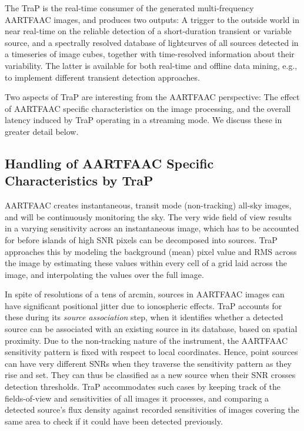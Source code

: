 \documentclass{ws-jai}
\begin{document}
The TraP  is the  real-time consumer of  the generated  multi-frequency AARTFAAC
images,  and produces  two  outputs: A  trigger  to the  outside  world in  near
real-time on  the reliable detection  of a short-duration transient  or variable
source,  and  a spectrally  resolved  database  of  lightcurves of  all  sources
detected in a timeseries of image cubes, together with time-resolved information
about their variability.  The latter is available for both real-time and offline
data mining, e.g., to implement different transient detection approaches.

Two aspects of TraP are interesting from the AARTFAAC perspective: The effect of
AARTFAAC  specific characteristics  on  the image  processing,  and the  overall
latency  induced by  TraP operating  in a  streaming mode.  We discuss  these in
greater detail below.\\

\subsection  {Handling of  AARTFAAC  Specific  Characteristics by  TraP}
AARTFAAC creates instantaneous, transit  mode (non-tracking) all-sky images, and
will be continuously monitoring the sky. The  very wide field of view results in
a varying sensitivity  across an instantaneous image, which has  to be accounted
for before  islands of  high SNR  pixels can be  decomposed into  sources.  TraP
approaches this by modeling the background (mean) pixel value and RMS across the
image by  estimating these values  within every cell of  a grid laid  across the
image, and interpolating the values over the full image.

In spite of resolutions of a tens of arcmin, sources in AARTFAAC images can have
significant positional  jitter due  to ionospheric  effects.  TraP  accounts for
these during its \textit{source association}  step, when it identifies whether a
detected source can be associated with an existing source in its database, based
on spatial  proximity.  Due to  the non-tracking  nature of the  instrument, the
AARTFAAC sensitivity pattern is fixed  with respect to local coordinates. Hence,
point sources  can have very different  SNRs when they traverse  the sensitivity
pattern as they rise and set.  They can  thus be classified as a new source when
their SNR crosses detection thresholds.  TraP accommodates such cases by keeping
track of  the fields-of-view and sensitivities  of all images it  processes, and
comparing a  detected source's  flux density  against recorded  sensitivities of
images  covering  the  same  area  to  check if  it  could  have  been  detected
previously.
\end{document}
